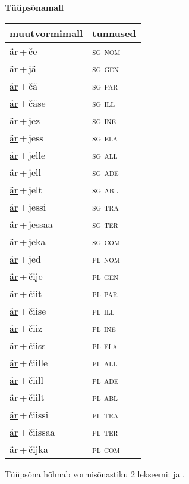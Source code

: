 
\vspace{1.8em}
\begin{minipage}{\textwidth}
\textbf{Tüüpsõnamall \,}\\

\begin{sideways}
\begin{tabular}{l l}
muutvormimall & tunnused \\
\hline
\underline{är}\,+\,če & \textsc{ sg nom } \\
\underline{är}\,+\,jä & \textsc{ sg gen } \\
\underline{är}\,+\,čä & \textsc{ sg par } \\
\underline{är}\,+\,čäse & \textsc{ sg ill } \\
\underline{är}\,+\,jez & \textsc{ sg ine } \\
\underline{är}\,+\,jess & \textsc{ sg ela } \\
\underline{är}\,+\,jelle & \textsc{ sg all } \\
\underline{är}\,+\,jell & \textsc{ sg ade } \\
\underline{är}\,+\,jelt & \textsc{ sg abl } \\
\underline{är}\,+\,jessi & \textsc{ sg tra } \\
\underline{är}\,+\,jessaa & \textsc{ sg ter } \\
\underline{är}\,+\,jeka & \textsc{ sg com } \\
\underline{är}\,+\,jed & \textsc{ pl nom } \\
\underline{är}\,+\,čije & \textsc{ pl gen } \\
\underline{är}\,+\,čiit & \textsc{ pl par } \\
\underline{är}\,+\,čiise & \textsc{ pl ill } \\
\underline{är}\,+\,čiiz & \textsc{ pl ine } \\
\underline{är}\,+\,čiiss & \textsc{ pl ela } \\
\underline{är}\,+\,čiille & \textsc{ pl all } \\
\underline{är}\,+\,čiill & \textsc{ pl ade } \\
\underline{är}\,+\,čiilt & \textsc{ pl abl } \\
\underline{är}\,+\,čiissi & \textsc{ pl tra } \\
\underline{är}\,+\,čiissaa & \textsc{ pl ter } \\
\underline{är}\,+\,čijka & \textsc{ pl com } \\
\end{tabular}
\end{sideways}
\label{tab:tüüpsõnamall-ärče}

\end{minipage}

 
\vspace{1em}
\noindent Tüüpsõna hõlmab vormisõnastiku 2 lekseemi:  ja .
